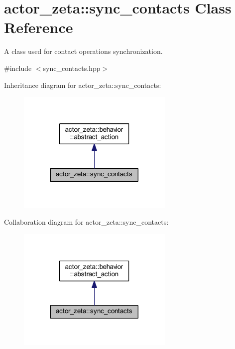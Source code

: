 \hypertarget{classactor__zeta_1_1sync__contacts}{}\section{actor\+\_\+zeta\+:\+:sync\+\_\+contacts Class Reference}
\label{classactor__zeta_1_1sync__contacts}


A class used for contact operations synchronization.  




{\ttfamily \#include $<$sync\+\_\+contacts.\+hpp$>$}



Inheritance diagram for actor\+\_\+zeta\+:\+:sync\+\_\+contacts\+:\nopagebreak
\begin{figure}[H]
\begin{center}
\leavevmode
\includegraphics[width=212pt]{classactor__zeta_1_1sync__contacts__inherit__graph}
\end{center}
\end{figure}


Collaboration diagram for actor\+\_\+zeta\+:\+:sync\+\_\+contacts\+:\nopagebreak
\begin{figure}[H]
\begin{center}
\leavevmode
\includegraphics[width=212pt]{classactor__zeta_1_1sync__contacts__coll__graph}
\end{center}
\end{figure}
